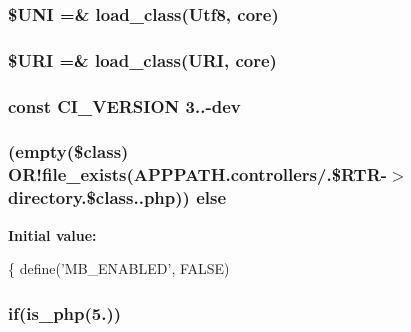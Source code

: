 \subsubsection[{\$\+U\+N\+I}]{\setlength{\rightskip}{0pt plus 5cm}\$U\+N\+I =\& load\+\_\+class(\textquotesingle{}Utf8\textquotesingle{}, \textquotesingle{}core\textquotesingle{})}\label{system_2core_2_code_igniter_8php_a2060dabd8d00b5b0539bd041bf450924}
\hypertarget{system_2core_2_code_igniter_8php_a630d83d898b39ad4568906284f7f5336}{}
\subsubsection[{\$\+U\+R\+I}]{\setlength{\rightskip}{0pt plus 5cm}\$U\+R\+I =\& load\+\_\+class(\textquotesingle{}U\+R\+I\textquotesingle{}, \textquotesingle{}core\textquotesingle{})}\label{system_2core_2_code_igniter_8php_a630d83d898b39ad4568906284f7f5336}
\hypertarget{system_2core_2_code_igniter_8php_a32e3c3927ba8ec93df92327dfd85d564}{}
\subsubsection[{C\+I\+\_\+\+V\+E\+R\+S\+I\+O\+N}]{\setlength{\rightskip}{0pt plus 5cm}const C\+I\+\_\+\+V\+E\+R\+S\+I\+O\+N \textquotesingle{}3..-\/dev\textquotesingle{}}\label{system_2core_2_code_igniter_8php_a32e3c3927ba8ec93df92327dfd85d564}
\hypertarget{system_2core_2_code_igniter_8php_ac5109000d551293e102a2bc06f29cda4}{}
\subsubsection[{else}]{ (empty(\$class) O\+R!file\+\_\+exists(A\+P\+P\+P\+A\+T\+H.\textquotesingle{}controllers/\textquotesingle{}.\$R\+T\+R-\/$>$directory.\$class.\textquotesingle{}.php\textquotesingle{})) else}\label{system_2core_2_code_igniter_8php_ac5109000d551293e102a2bc06f29cda4}
{\bfseries Initial value\+:}
\begin{DoxyCode}
\{
        define(\textcolor{stringliteral}{'MB\_ENABLED'}, FALSE)
\end{DoxyCode}
\hypertarget{system_2core_2_code_igniter_8php_a6503a8f8da73cafe64ad07639c198f54}{}
\subsubsection[{if}]{\setlength{\rightskip}{0pt plus 5cm}if({\bf is\+\_\+php}(\textquotesingle{}5.\textquotesingle{}))}\label{system_2core_2_code_igniter_8php_a6503a8f8da73cafe64ad07639c198f54}
